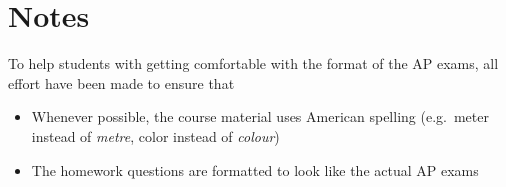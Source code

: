 \documentclass{../../oss-handout}
\begin{document}
\section*{Notes}
To help students with getting comfortable with the format of the AP exams, all
effort have been made to ensure that
\begin{itemize}[nosep]
\item Whenever possible, the course material uses American spelling (e.g.\
  meter instead of \emph{metre}, color instead of \emph{colour})
\item The homework questions are formatted to look like the actual AP exams
\end{itemize}
\end{document}
